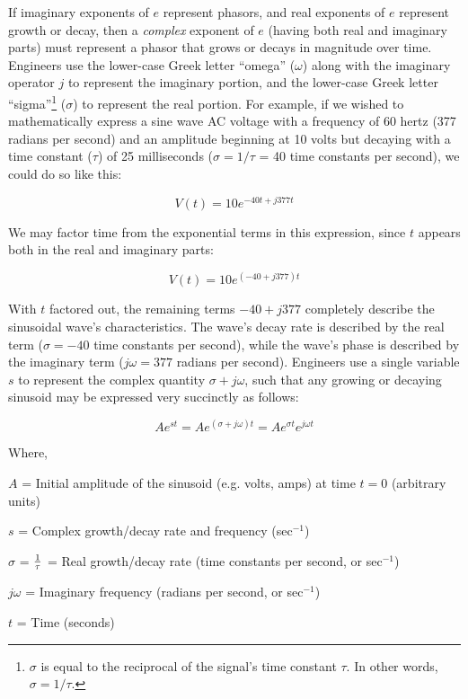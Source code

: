 \vskip 10pt

If imaginary exponents of $e$ represent phasors, and real exponents of $e$ represent growth or decay, then a \textit{complex} exponent of $e$ (having both real and imaginary parts) must represent a phasor that grows or decays in magnitude over time.  Engineers use the lower-case Greek letter ``omega'' ($\omega$) along with the imaginary operator $j$ to represent the imaginary portion, and the lower-case Greek letter ``sigma''\footnote{$\sigma$ is equal to the reciprocal of the signal's time constant $\tau$.  In other words, $\sigma = 1 / \tau$.} ($\sigma$) to represent the real portion.  For example, if we wished to mathematically express a sine wave AC voltage with a frequency of 60 hertz (377 radians per second) and an amplitude beginning at 10 volts but decaying with a time constant ($\tau$) of 25 milliseconds ($\sigma = 1 / \tau$ = 40 time constants per second), we could do so like this:

$$V(t) = 10 e^{-40t + j377t}$$

We may factor time from the exponential terms in this expression, since $t$ appears both in the real and imaginary parts:

$$V(t) = 10 e^{(-40 + j377)t}$$

\filbreak

With $t$ factored out, the remaining terms $-40 + j377$ completely describe the sinusoidal wave's characteristics.  The wave's decay rate is described by the real term ($\sigma = -40$ time constants per second), while the wave's phase is described by the imaginary term ($j \omega = 377$ radians per second).  Engineers use a single variable $s$ to represent the complex quantity $\sigma + j\omega$, such that any growing or decaying sinusoid may be expressed very succinctly as follows:  

$$Ae^{st} = Ae^{(\sigma + j\omega)t} = Ae^{\sigma t} e^{j \omega t}$$

\noindent
Where,

$A$ = Initial amplitude of the sinusoid (e.g. volts, amps) at time $t = 0$ (arbitrary units)

$s$ = Complex growth/decay rate and frequency (sec$^{-1}$)

$\sigma$ = $1 \over \tau$ = Real growth/decay rate (time constants per second, or sec$^{-1}$)

$j \omega$ = Imaginary frequency (radians per second, or sec$^{-1}$)

$t$ = Time (seconds)

